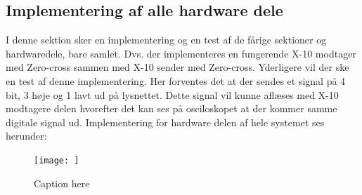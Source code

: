 \documentclass[11pt]{article}
\begin{document}
\subsection{Implementering af alle hardware dele}
I denne sektion sker en implementering og en test af de fårige sektioner og hardwaredele, bare samlet. Dvs. der implementeres en fungerende X-10 modtager med Zero-cross sammen med X-10 sender med Zero-cross. Yderligere vil der ske en test af denne implementering. Her forventes det at der sendes et signal på 4 bit, 3 høje og 1 lavt ud på lysnettet. Dette signal vil kunne aflæses med X-10 modtagere delen hvorefter det kan ses på osciloskopet at der kommer samme digitale signal ud. Implementering for hardware delen af hele systemet ses herunder:
\begin{figure}[H]
	\centering
	\texttt{[image: ]}
	\caption{Caption here}
	\label{fig:figure1}
\end{figure}
\end{document}

